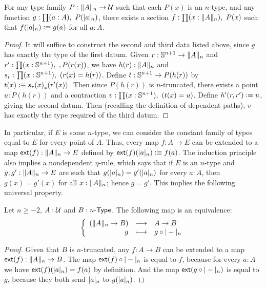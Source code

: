 \begin{thm}\label{thm:truncn-ind}
  For any type family $P:\trunc n A \to \type$ such that each $P(x)$ is an $n$-type, and any function $g : \prd{a:A} P(\tproj n a)$, there exists a section $f:\prd{x:\trunc n A} P(x)$ such that $f(\tproj n a)\defeq g(a)$ for all $a:A$.
\end{thm}
\begin{proof}
  It will suffice to construct the second and third data listed above, since $g$ has exactly the type of the first datum.
  Given $r:\Sn^{n+1} \to \trunc n A$ and $r':\prd{x:\Sn^{n+1}}, P(r(x))$, we have $h(r):\trunc n A$ and $s_r :\prd{x:\Sn^{n+1}} (r(x) = h(r))$.
  Define $t:\Sn^{n+1} \to P(h(r))$ by $t(x) \defeq \trans{s_r(x)}{r'(x)}$.
  Then since $P(h(r))$ is $n$-truncated, there exists a point $u:P(h(r))$ and a contraction $v:\prd{x:\Sn^{n+1}} (t(x) = u)$.
  Define $h'(r,r') \defeq u$, giving the second datum.
  Then (recalling the definition of dependent paths), $v$ has exactly the type required of the third datum.
\end{proof}

In particular, if $E$ is some $n$-type, we can consider the constant family of types equal to $E$ for every point of $A$.
Thus, every map $f:A\to{}E$ can be extended to a map $\extend{f}:\trunc nA\to{}E$ defined by $\extend{f}(\tproj na)\defeq f(a)$.
The induction principle also implies a nondependent $\eta$-rule, which says that if $E$ is an $n$-type and $g,g':\trunc nA\to{}E$ are such that $g(\tproj na)=g'(\tproj na)$ for every $a:A$, then $g(x)=g'(x)$ for all $x:\trunc nA$; hence $g=g'$.
This implies the following universal property.

\begin{lem}
  Let $n\ge-2$, $A:\type$ and $B:\typele{n}$. The following map is an
  equivalence:
  \[\function{(\trunc nA\to{}B)}{A\to{}B}{g}{g\circ\tprojf n}\]
\end{lem}

\begin{proof}
  Given that $B$ is $n$-truncated, any $f:A\to{}B$ can be extended to a map $\extend{f}:\trunc nA\to{}B$.
  The map $\extend{f}\circ\tprojf n$ is equal to $f$, because for every $a:A$ we have $\extend{f}(\tproj na)=f(a)$ by definition.
  And the map $\extend{g\circ\tprojf n}$ is equal to $g$, because they both send $\tproj na$ to $g(\tproj na)$.
\end{proof}

